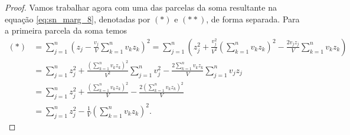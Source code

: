 \begin{proof}
Vamos trabalhar agora com uma das parcelas da soma resultante na equação \eqref{eq:sn_marg_8}, denotadas por $(*)$ e $(**)$, de forma separada. Para a primeira parcela da soma temos
\begin{equation}
\begin{split}
(*)& =\sum_{j=1}^n\left(z_j - \frac{v_j}{V}\sum_{k=1}^nv_kz_k\right)^2  = \sum_{j=1}^n\left(z_j^2+\frac{v_j^2}{V^2}\left(\sum_{k=1}^nv_kz_k\right)^2-\frac{2v_jz_j}{V}\sum_{k=1}^nv_kz_k\right) \\
{} & = \sum_{j=1}^nz_j^2 +\frac{\left(\sum_{k=1}^nv_kz_k\right)^2}{V^2}\sum_{j=1}^nv_j^2 -\frac{2\sum_{k=1}^nv_kz_k}{V}\sum_{j=1}^nv_jz_j  \\
{} & = \sum_{j=1}^nz_j^2 +\frac{\left(\sum_{k=1}^nv_kz_k\right)^2}{V} -\frac{2\left(\sum_{k=1}^nv_kz_k\right)^2}{V} \\
{} & = \sum_{j=1}^nz_j^2 -\frac{1}{V}\left(\sum_{k=1}^nv_kz_k\right)^2.
\end{split}
\end{equation}


\end{proof}

